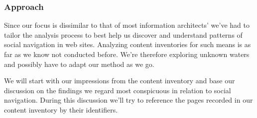 \subsubsection{Approach}
Since our focus is dissimilar to that of most information architects' we've
had to tailor the analysis process to best help us discover and understand
patterns of social navigation in web sites. Analyzing content inventories for
such means is as far as we know not conducted before. We're therefore
exploring unknown waters and possibly have to adapt our method as we go.

We will start with our impressions from the content inventory%
and base our discussion on the findings we regard most conspicuous in
relation to social navigation. During this discussion we'll try to reference
the pages recorded in our content inventory by their identifiers.
